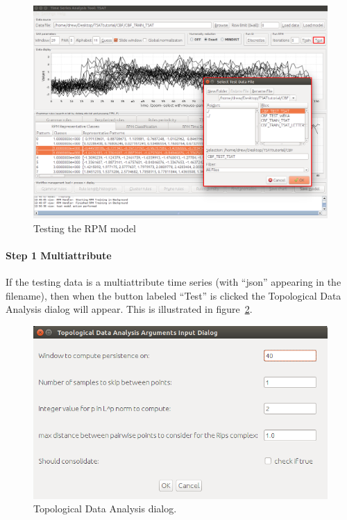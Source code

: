 \documentclass[titlepage, letterpaper, 12pt]{article}
\begin{document}
\begin{figure}[H]
	\includegraphics[width=\textwidth]{TSAT-testing-step-1}
	\caption{Testing the RPM model}
	\label{fig:TSAT-testing-step-1}
\end{figure}

\paragraph{Step 1 Multiattribute}
If the testing data is a multiattribute time series (with ``json'' appearing in the filename), then when the button labeled ``Test'' is clicked the Topological Data Analysis dialog will appear.  This is illustrated in figure~\ref{fig:tda-args-dialogTest}. 

\begin{figure}
	\centering
	\includegraphics[width=\textwidth]{pictures/TDA-args-dialog}
	\caption{Topological Data Analysis dialog.}
	\label{fig:tda-args-dialogTest}
\end{figure}
\end{document}
